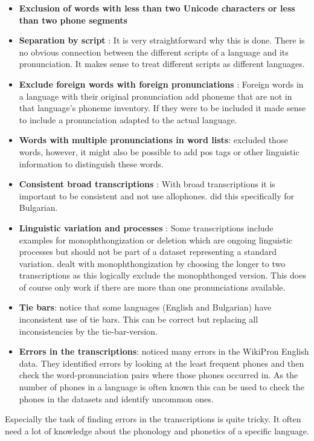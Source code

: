 \begin{itemize}
\item \textbf{Exclusion of words with less than two Unicode characters or less than two phone segments} \citep{Ashby&Bartley.2021}
\item \textbf{Separation by script} \citep{Ashby&Bartley.2021}: It is very straightforward why this is done. There is no obvious connection between the different scripts of a language and its pronunciation. It makes sense to treat different scripts as different languages. 
\item \textbf{Exclude foreign words with foreign pronunciations} \citep{Ashby&Bartley.2021}: Foreign words in a language with their original pronunciation add phoneme that are not in that language's phoneme inventory. If they were to be included it made sense to include a pronunciation adapted to the actual language.
\item \textbf{Words with multiple pronunciations in word lists}: \cite{Ashby&Bartley.2021} excluded those words, however, it might also be possible to add \ac{pos} tags or other linguistic information to distinguish these words.
\item \textbf{Consistent broad transcriptions} \citep{Ashby&Bartley.2021}: With broad transcriptions it is important to be consistent and not use allophones. \cite{Ashby&Bartley.2021} did this specifically for Bulgarian.
\item \textbf{Linguistic variation and processes} \citep{Ashby&Bartley.2021}: Some transcriptions include examples for monophthongization or deletion which are ongoing linguistic processes but should not be part of a dataset representing a standard variation. \cite{Ashby&Bartley.2021} dealt with monophthongization by choosing the longer to two transcriptions as this logically exclude the monophthonged version. This does of course only work if there are more than one pronunciations available. 
\item \textbf{Tie bars}: \cite{Ashby&Bartley.2021} notice that some languages (English and Bulgarian) have inconsistent use of tie bars. This can be correct but replacing all inconsistencies by the tie-bar-version.
\item \textbf{Errors in the transcriptions}: \citet{gautam.2021} noticed many errors in the WikiPron English data. They identified errors by looking at the least frequent phones and then check the word-pronunciation pairs where those phones occurred in. As the number of phones in a language is often known this can be used to check the phones in the datasets and identify uncommon ones. 
\end{itemize}

Especially the task of finding errors in the transcriptions is quite tricky. It often need a lot of knowledge about the phonology and phonetics of a specific language. 
